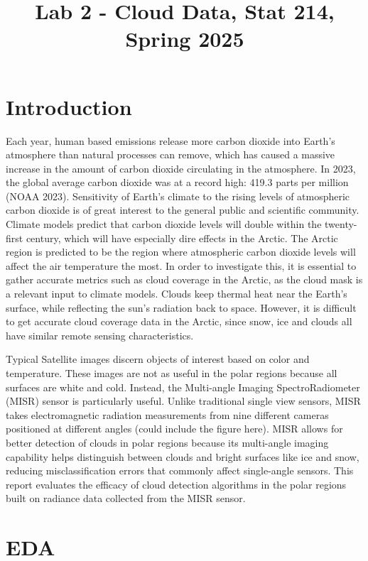 \documentclass[11pt,letterpaper]{article}
\title{Lab 2 - Cloud Data, Stat 214, Spring 2025\vspace{-2em}}
\begin{document}
\maketitle
\section{Introduction}
Each year, human based emissions release more carbon dioxide into Earth’s atmosphere than natural processes can remove, which has caused a massive increase in the amount of carbon dioxide circulating in the atmosphere. In 2023, the global average carbon dioxide was at a record high: 419.3 parts per million (NOAA 2023). Sensitivity of Earth’s climate to the rising levels of atmospheric carbon dioxide is of great interest to the general public and scientific community. Climate models predict that carbon dioxide levels will double within the twenty-first century, which will have especially dire effects in the Arctic. The Arctic region is predicted to be the region where atmospheric carbon dioxide levels will affect the air temperature the most. In order to investigate this, it is essential to gather accurate metrics such as cloud coverage in the Arctic, as the cloud mask is a relevant input to climate models. Clouds keep thermal heat near the Earth’s surface, while reflecting the sun’s radiation back to space. However, it is difficult to get accurate cloud coverage data in the Arctic, since snow, ice and clouds all have similar remote sensing characteristics. 

Typical Satellite images discern objects of interest based on color and temperature. These images are not as useful in the polar regions because all surfaces are white and cold. Instead, the Multi-angle Imaging SpectroRadiometer (MISR) sensor is particularly useful. Unlike traditional single view sensors, MISR takes electromagnetic radiation measurements from nine different cameras positioned at different angles (could include the figure here). MISR allows for better detection of clouds in polar regions because its multi-angle imaging capability helps distinguish between clouds and bright surfaces like ice and snow, reducing misclassification errors that commonly affect single-angle sensors. This report evaluates the efficacy of cloud detection algorithms in the polar regions built on radiance data collected from the MISR sensor. 

\section{EDA}
\end{document}
